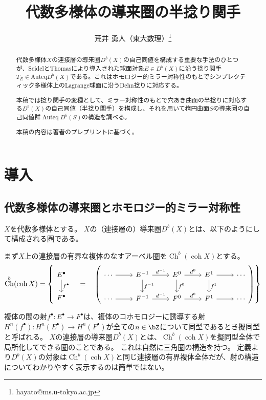 \documentclass[uplatex,a4paper,dvipdfmx]{jsarticle}
\title{代数多様体の導来圏の半捻り関手}
\author{荒井 勇人（東大数理）\thanks{hayato@ms.u-tokyo.ac.jp}}
\theoremstyle{plain}
\theoremstyle{definition}
\DeclareMathOperator{\Auteq}{\mathrm{Auteq}}
\DeclareMathOperator{\Ch}{\mathrm{Ch}}
\DeclareMathOperator{\coh}{\mathrm{coh}}
\begin{document}
\maketitle

\begin{abstract}
	代数多様体$X$の連接層の導来圏$D^b(X)$の自己同値を構成する重要な手法のひとつが、SeidelとThomasにより導入された球面対象$E \in D^b(X)$に沿う捻り関手$T_E \in \mathrm{Auteq} D^b(X)$である。これはホモロジー的ミラー対称性のもとでシンプレクティック多様体上のLagrange球面に沿うDehn捻りに対応する。

	本稿では捻り関手の変種として、ミラー対称性のもとで穴あき曲面の半捻りに対応する$D^b(X)$の自己同値（半捻り関手）を構成し、それを用いて楕円曲面$S$の導来圏の自己同値群$\Auteq D^b(S)$の構造を調べる。

	本稿の内容は著者のプレプリント\cite{2023arXiv230212501A}に基づく。
\end{abstract}

\section{導入}
\subsection{代数多様体の導来圏とホモロジー的ミラー対称性}
$X$を代数多様体とする。
$X$の（連接層の）導来圏$D^b(X)$とは、以下のようにして構成される圏である。

まず$X$上の連接層の有界な複体のなすアーベル圏を$\Ch^b(\coh X)$とする。
\begin{equation}
	\Ch^b(\coh X) = \left\{
	  \begin{tikzcd}
		  E^\bullet \arrow[d, "f^\bullet", name=F]\\
		  F^\bullet
	  \end{tikzcd}
	  \quad = \quad
	  \left(
	  \begin{tikzcd}
			  \cdots \arrow[r] &E^{-1} \arrow[r, "d^{-1}"]\arrow[d, "f^{-1}"] &E^0 \arrow[r, "d^{0}"]\arrow[d, "f^{0}"] &E^1 \arrow[d, "f^{1}"] \arrow[r] &\cdots\\
			  \cdots \arrow[r] &F^{-1} \arrow[r, "d^{-1}"] &F^0 \arrow[r, "d^{0}"] &F^1\arrow[r] &\cdots
		  \end{tikzcd}
	  \right)
	\right\}
\end{equation}


複体の間の射$f^\bullet \colon E^\bullet \to F^\bullet$は、複体のコホモロジーに誘導する射$H^n(f^\bullet) \colon H^n(E^\bullet) \to H^n(F^\bullet)$が全ての$n \in \bZ$について同型であるとき擬同型と呼ばれる。
$X$の連接層の導来圏$D^b(X)$とは、$\Ch^b(\coh X)$を擬同型全体で局所化してできる圏のことである。
これは自然に三角圏の構造を持つ。
定義より$D^b(X)$の対象は$\Ch^b(\coh X)$と同じ連接層の有界複体全体だが、射の構造についてわかりやすく表示するのは簡単ではない。
\end{document}
